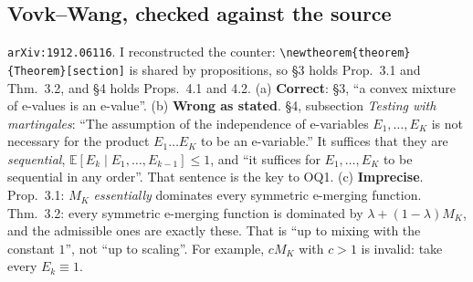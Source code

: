 \documentclass[11pt]{article}
\newcommand{\E}{\mathbb{E}}
\begin{document}
\subsection{Vovk--Wang, checked against the source}
\texttt{arXiv:1912.06116}. I reconstructed the counter: \verb|\newtheorem{theorem}{Theorem}[section]| is shared by propositions, so \S3 holds Prop.~3.1 and Thm.~3.2, and \S4 holds Props.~4.1 and 4.2. (a) \textbf{Correct}: \S3, ``a convex mixture of e-values is an e-value''. (b) \textbf{Wrong as stated}. \S4, subsection \emph{Testing with martingales}: ``The assumption of the independence of e-variables $E_1,\dots,E_K$ is not necessary for the product $E_1\dots E_K$ to be an e-variable.'' It suffices that they are \emph{sequential}, $\E[E_k\mid E_1,\dots,E_{k-1}]\le1$, and ``it suffices for $E_1,\dots,E_K$ to be sequential in any order''. That sentence is the key to OQ1. (c) \textbf{Imprecise}. Prop.~3.1: $M_K$ \emph{essentially} dominates every symmetric e-merging function. Thm.~3.2: every symmetric e-merging function is dominated by $\lambda+(1-\lambda)M_K$, and the admissible ones are exactly these. That is ``up to mixing with the constant $1$'', not ``up to scaling''. For example, $cM_K$ with $c>1$ is invalid: take every $E_k\equiv1$.
\end{document}
